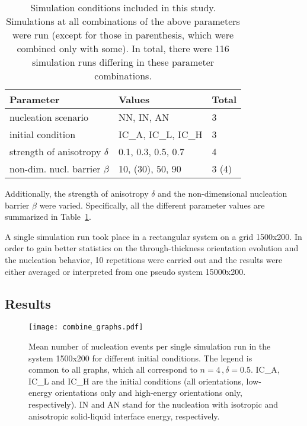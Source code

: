 \begin{table}[t]
	\begin{center}
		\caption[MC simulation - parameters included in this parameter study]{Simulation conditions included in this study. Simulations at all combinations of the above parameters were run (except for those in parenthesis, which were combined only with some). In total, there were 116 simulation runs differing in these parameter combinations.}
		\label{tab_sim_conditions}
		\begin{tabular}{lll}
			\hline
			Parameter                       & Values              & Total \\ \hline
			nucleation scenario             & NN, IN, AN          & 3     \\
			initial condition               & IC\_A, IC\_L, IC\_H & 3     \\
			strength of anisotropy $\delta$ & 0.1, 0.3, 0.5, 0.7  & 4     \\
			non-dim. nucl. barrier $\beta$  & 10, (30), 50, 90          & 3 (4)    \\ \hline
		\end{tabular}
	\end{center}
\end{table}

Additionally, the strength of anisotropy $\delta$ and the non-dimensional nucleation barrier $\beta$ were varied. Specifically, all the different parameter values are summarized in Table~\ref{tab_sim_conditions}.

A single simulation run took place in a rectangular system on a grid 1500x200. In order to gain better statistics on the through-thickness orientation evolution and the nucleation behavior, 10 repetitions were carried out and the results were either averaged or interpreted from one pseudo system 15000x200.

\subsection{Results}
\begin{figure}
	\centering
	\texttt{[image: combine\_graphs.pdf]}
	\caption[MC simulation results - mean number of nucleation events for different initial conditions]{Mean number of nucleation events per single simulation run in the system 1500x200 for different initial conditions. The legend is common to all graphs, which all correspond to $n=4\,,\delta=0.5$. IC\_A, IC\_L and IC\_H are the initial conditions (all orientations, low-energy orientations only and high-energy orientations only, respectively). IN and AN stand for the nucleation with isotropic and anisotropic solid-liquid interface energy, respectively.}
	\label{fig_MC_mean_events}
\end{figure}

